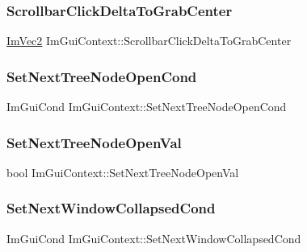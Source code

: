 \subsubsection{\texorpdfstring{Scrollbar\+Click\+Delta\+To\+Grab\+Center}{ScrollbarClickDeltaToGrabCenter}}
{\footnotesize\ttfamily \hyperlink{struct_im_vec2}{Im\+Vec2} Im\+Gui\+Context\+::\+Scrollbar\+Click\+Delta\+To\+Grab\+Center}

\hypertarget{struct_im_gui_context_a2b78c616a3d9d26cfe28c575fe6506dc}{}\label{struct_im_gui_context_a2b78c616a3d9d26cfe28c575fe6506dc} 
\subsubsection{\texorpdfstring{Set\+Next\+Tree\+Node\+Open\+Cond}{SetNextTreeNodeOpenCond}}
{\footnotesize\ttfamily Im\+Gui\+Cond Im\+Gui\+Context\+::\+Set\+Next\+Tree\+Node\+Open\+Cond}

\hypertarget{struct_im_gui_context_aab81a8f92b73046a0277f77fad4dcc85}{}\label{struct_im_gui_context_aab81a8f92b73046a0277f77fad4dcc85} 
\subsubsection{\texorpdfstring{Set\+Next\+Tree\+Node\+Open\+Val}{SetNextTreeNodeOpenVal}}
{\footnotesize\ttfamily bool Im\+Gui\+Context\+::\+Set\+Next\+Tree\+Node\+Open\+Val}

\hypertarget{struct_im_gui_context_a90e757b4703c106ecd41b05670f5799a}{}\label{struct_im_gui_context_a90e757b4703c106ecd41b05670f5799a} 
\subsubsection{\texorpdfstring{Set\+Next\+Window\+Collapsed\+Cond}{SetNextWindowCollapsedCond}}
{\footnotesize\ttfamily Im\+Gui\+Cond Im\+Gui\+Context\+::\+Set\+Next\+Window\+Collapsed\+Cond}


